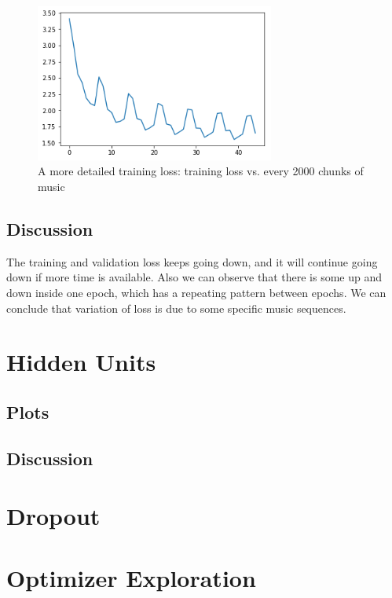 \documentclass{article}
\begin{document}
\begin{figure}[h]
\centering
\includegraphics[width=0.7\textwidth]{pics/every_2000_train_loss.png}
\caption{A more detailed training loss: training loss vs. every 2000 chunks of music}
\end{figure}
\subsection{Discussion}
The training and validation loss keeps going down, and it will continue going down if more time is available. Also we can observe that there is some up and down inside one epoch, which has a repeating pattern between epochs. We can conclude that variation of loss is due to some specific music sequences.  
\newpage


\section{Hidden Units}
\subsection{Plots}
\subsection{Discussion}

\section{Dropout}
\newpage
\section{Optimizer Exploration}
\end{document}
